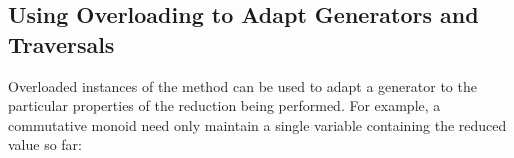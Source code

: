 \subsection{Using Overloading to Adapt Generators and Traversals}

Overloaded instances of the  method can be used to adapt
a generator to the particular properties of the reduction being
performed.  For example, a commutative monoid need only maintain a
single variable  containing the reduced value so far:
